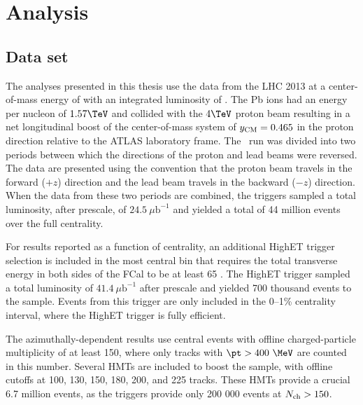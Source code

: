 \chapter{Analysis}
\label{ch:analysis}
\graphicspath{{Chapter-Analysis/figures/}}

\section{Data set}

The analyses presented in this thesis use the data from the \ac{LHC} 2013 \pPb at a center-of-mass energy of \pPbenergy with an integrated luminosity of \pPblumi.
The Pb ions had an energy per nucleon of $1.57 \TeV$ and collided with the $4 \TeV$ proton beam resulting in a net longitudinal boost of the center-of-mass system of $y_{\mathrm{CM}} = 0.465$ in the proton direction relative to the ATLAS laboratory frame.
The \pPb\ run was divided into two periods between which the directions of the proton and lead beams were
reversed. 
The data are presented using the convention that the proton beam travels in the forward ($+z$) direction and the lead beam travels in the backward ($-z$) direction.
When the data from these two periods are combined, the \minbias triggers sampled a total luminosity, after prescale, of $24.5~\mu\textrm{b}^{-1}$ and yielded a total of 44 million events over the full centrality.

For results reported as a function of centrality, an additional \ac{HighET} trigger selection is included in the most central bin that requires the total transverse energy in both sides of the \ac{FCal} to be at least 65 \GeV.
The \ac{HighET} trigger sampled a total luminosity of $41.4~\mu\textrm{b}^{-1}$ after prescale and yielded 700 thousand events to the sample.
Events from this trigger are only included in the 0--1\% centrality interval, where the \ac{HighET} trigger is fully efficient.

The azimuthally-dependent results use central events with offline charged-particle multiplicity \Nch of at least 150, where only tracks with $\pt > 400~\MeV$ are counted in this number.
Several \acp{HMT} are included to boost the sample, with offline \Nch cutoffs at 100, 130, 150, 180, 200, and 225 tracks.
These \acp{HMT} provide a crucial 6.7 million events, as the \minbias triggers provide only 200 000 events at $\mbox{$N_{\mathrm{ch}}$} > 150$.

